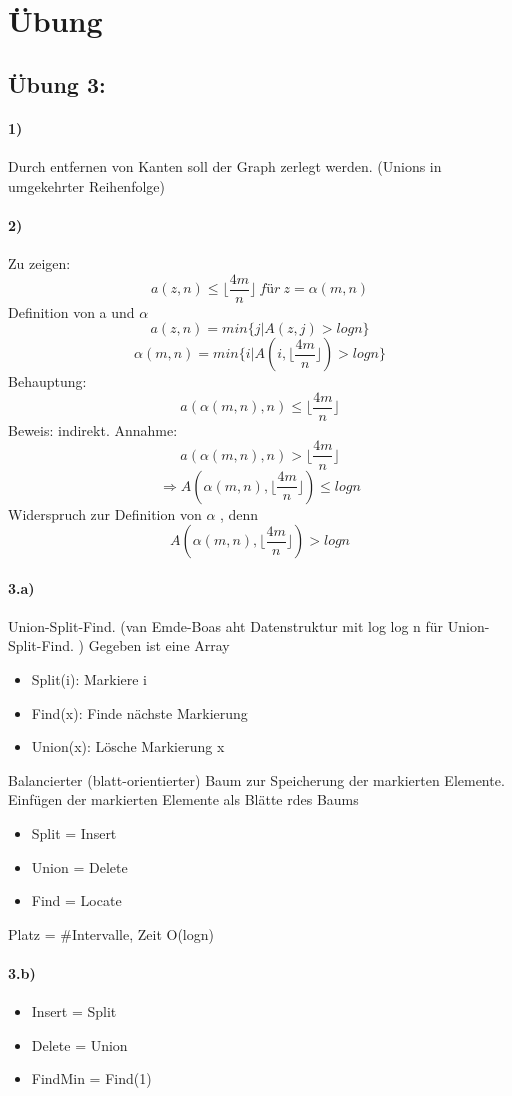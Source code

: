 

\section{Übung}
\subsection*{Übung 3:}
\paragraph{1)} Durch entfernen von Kanten soll der Graph zerlegt werden. (Unions in umgekehrter Reihenfolge)

\paragraph{2)}
Zu zeigen:
$$ a(z,n) \leq \lfloor\frac{4m}{n}\rfloor\ für\  z=\alpha (m,n) $$
Definition von a und $ \alpha $ 
$$a(z,n) = min \{j|A(z,j) > logn \} $$
$$\alpha(m,n)=min\{i|A(i, \lfloor\frac{4m}{n}\rfloor) > logn\}$$
Behauptung:
$$a(\alpha(m,n), n) \leq \lfloor\frac{4m}{n}\rfloor$$
Beweis: indirekt. Annahme:
$$a(\alpha(m,n), n) > \lfloor\frac{4m}{n}\rfloor$$
$$\Rightarrow A(\alpha(m,n),\lfloor\frac{4m}{n}\rfloor) \leq logn $$
Widerspruch zur Definition von $ \alpha $ , denn
$$A(\alpha(m,n),\lfloor\frac{4m}{n}\rfloor) > logn $$

\paragraph{3.a)} Union-Split-Find. (van Emde-Boas aht Datenstruktur mit log log n für Union-Split-Find. ) Gegeben ist eine Array
\begin{itemize}
    \item Split(i): Markiere i
    \item Find(x): Finde nächste Markierung
    \item Union(x): Lösche Markierung x
\end{itemize}
Balancierter (blatt-orientierter) Baum zur Speicherung der markierten Elemente. Einfügen der markierten Elemente als Blätte rdes Baums
\begin{itemize}
    \item Split = Insert
    \item Union = Delete
    \item Find = Locate
\end{itemize}
Platz = \#Intervalle, Zeit O(logn)
\paragraph{3.b)} 
\begin{itemize}
    \item Insert = Split
    \item Delete = Union
    \item FindMin = Find(1)
\end{itemize}

